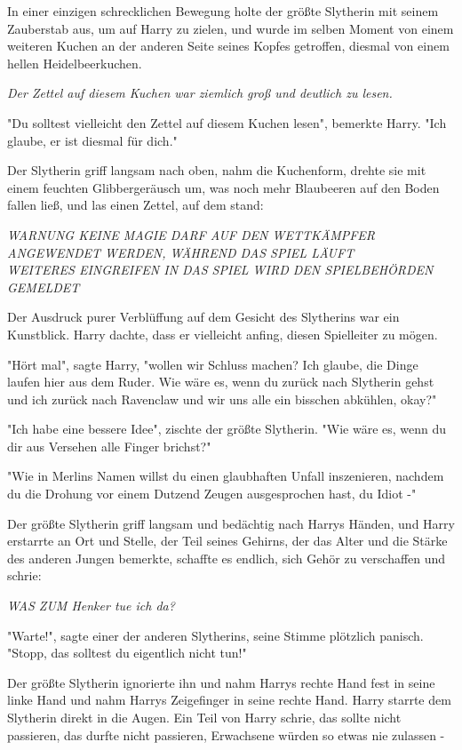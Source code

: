 {In einer einzigen schrecklichen Bewegung holte der größte Slytherin mit seinem Zauberstab aus, um auf Harry zu zielen, und wurde im selben Moment von einem weiteren Kuchen an der anderen Seite seines Kopfes getroffen, diesmal von einem hellen Heidelbeerkuchen.

\emph{Der Zettel auf diesem Kuchen war ziemlich groß und deutlich zu lesen.}

"Du solltest vielleicht den Zettel auf diesem Kuchen lesen", bemerkte Harry. "Ich glaube, er ist diesmal für dich."

Der Slytherin griff langsam nach oben, nahm die Kuchenform, drehte sie mit einem feuchten Glibbergeräusch um, was noch mehr Blaubeeren auf den Boden fallen ließ, und las einen Zettel, auf dem stand:

\emph{WARNUNG KEINE MAGIE DARF AUF DEN WETTKÄMPFER ANGEWENDET WERDEN, WÄHREND DAS SPIEL LÄUFT}\\ \emph{WEITERES EINGREIFEN IN DAS SPIEL WIRD DEN SPIELBEHÖRDEN GEMELDET}

Der Ausdruck purer Verblüffung auf dem Gesicht des Slytherins war ein Kunstblick. Harry dachte, dass er vielleicht anfing, diesen Spielleiter zu mögen.

"Hört mal", sagte Harry, "wollen wir Schluss machen? Ich glaube, die Dinge laufen hier aus dem Ruder. Wie wäre es, wenn du zurück nach Slytherin gehst und ich zurück nach Ravenclaw und wir uns alle ein bisschen abkühlen, okay?"

"Ich habe eine bessere Idee", zischte der größte Slytherin. "Wie wäre es, wenn du dir aus Versehen alle Finger brichst?"

"Wie in Merlins Namen willst du einen glaubhaften Unfall inszenieren, nachdem du die Drohung vor einem Dutzend Zeugen ausgesprochen hast, du Idiot -"

Der größte Slytherin griff langsam und bedächtig nach Harrys Händen, und Harry erstarrte an Ort und Stelle, der Teil seines Gehirns, der das Alter und die Stärke des anderen Jungen bemerkte, schaffte es endlich, sich Gehör zu verschaffen und schrie:

\emph{WAS ZUM Henker tue ich da?}

"Warte!", sagte einer der anderen Slytherins, seine Stimme plötzlich panisch. "Stopp, das solltest du eigentlich nicht tun!"

Der größte Slytherin ignorierte ihn und nahm Harrys rechte Hand fest in seine linke Hand und nahm Harrys Zeigefinger in seine rechte Hand. Harry starrte dem Slytherin direkt in die Augen. Ein Teil von Harry schrie, das sollte nicht passieren, das durfte nicht passieren, Erwachsene würden so etwas nie zulassen -

}
